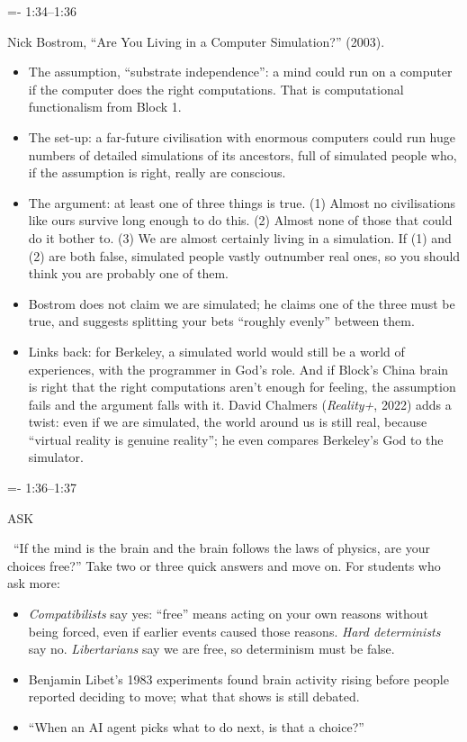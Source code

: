 \documentclass[11pt,letterpaper]{article}
\makeatletter
\newcommand{\keep}[1]{\par\penalty\z@\begingroup\dimen@=#1\relax\dimen@ii=\pagegoal\advance\dimen@ii-\pagetotal
  \ifdim\dimen@>\dimen@ii\ifdim\dimen@ii>\z@\vfil\break\fi\fi\endgroup}
\newcommand{\beat}[2]{\keep{3\baselineskip}\vspace{5pt}\noindent{\sffamily\bfseries #1}\hfill{\sffamily\small\color{muted}#2}\par\nopagebreak\vspace{1pt}}
\newcommand{\tagbox}[1]{\colorbox{tagbg}{\sffamily\scriptsize\bfseries\color{accent}\strut #1}}
\newcommand{\ask}{\tagbox{ASK}\ }
\makeatother
\begin{document}
\beat{Are we in a simulation?}{1:34--1:36}
Nick Bostrom, ``Are You Living in a Computer Simulation?'' (2003).
\begin{itemize}
\item The assumption, ``substrate independence'': a mind could run on a computer if the computer does the right computations. That is computational functionalism from Block 1.
\item The set-up: a far-future civilisation with enormous computers could run huge numbers of detailed simulations of its ancestors, full of simulated people who, if the assumption is right, really are conscious.
\item The argument: at least one of three things is true. (1) Almost no civilisations like ours survive long enough to do this. (2) Almost none of those that could do it bother to. (3) We are almost certainly living in a simulation. If (1) and (2) are both false, simulated people vastly outnumber real ones, so you should think you are probably one of them.
\item Bostrom does not claim we are simulated; he claims one of the three must be true, and suggests splitting your bets ``roughly evenly'' between them.
\item Links back: for Berkeley, a simulated world would still be a world of experiences, with the programmer in God's role. And if Block's China brain is right that the right computations aren't enough for feeling, the assumption fails and the argument falls with it. David Chalmers (\emph{Reality+}, 2022) adds a twist: even if we are simulated, the world around us is still real, because ``virtual reality is genuine reality''; he even compares Berkeley's God to the simulator.
\end{itemize}

\beat{Free will, one question}{1:36--1:37}
\ask ``If the mind is the brain and the brain follows the laws of physics, are your choices free?'' Take two or three quick answers and move on. For students who ask more:
\begin{itemize}
\item \emph{Compatibilists} say yes: ``free'' means acting on your own reasons without being forced, even if earlier events caused those reasons. \emph{Hard determinists} say no. \emph{Libertarians} say we are free, so determinism must be false.
\item Benjamin Libet's 1983 experiments found brain activity rising before people reported deciding to move; what that shows is still debated.
\item ``When an AI agent picks what to do next, is that a choice?''
\end{itemize}
\end{document}

